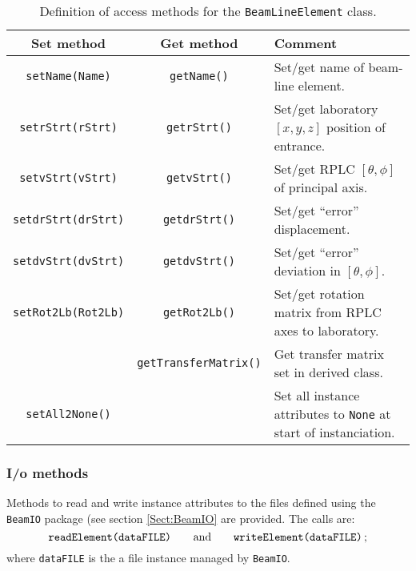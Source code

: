\begin{table}
  \caption{
    Definition of access methods for the \texttt{BeamLineElement}
    class. 
  }
  \label{Tab:BLE:Methods}
  \begin{center}
    \begin{tabular}{|c|c|p{7cm}|}
      \hline
      \textbf{Set method} & \textbf{Get method}  & \textbf{Comment}                                                         \\
      \hline
      \texttt{setName(Name)}     & \texttt{getName()}   & Set/get name of beam-line element.                                \\
      \texttt{setrStrt(rStrt)}   & \texttt{getrStrt()}  & Set/get laboratory $[x, y, z]$ position of entrance.              \\
      \texttt{setvStrt(vStrt)}   & \texttt{getvStrt()}  & Set/get RPLC $[\theta, \phi]$ of principal axis.                  \\
      \texttt{setdrStrt(drStrt)} & \texttt{getdrStrt()} & Set/get ``error'' displacement.                                   \\
      \texttt{setdvStrt(dvStrt)} & \texttt{getdvStrt()} & Set/get ``error'' deviation in $[\theta, \phi]$.                  \\
      \texttt{setRot2Lb(Rot2Lb)} & \texttt{getRot2Lb()} & Set/get rotation matrix from RPLC axes to laboratory.             \\
                         & \texttt{getTransferMatrix()} & Get transfer matrix set in derived class.                         \\
      \texttt{setAll2None()}     &                      & Set all instance attributes to \texttt{None} at start of instanciation. \\
      \hline
    \end{tabular}
  \end{center}
\end{table}

\subsubsection{I/o methods}
Methods to read and write instance attributes to the files defined
using the \texttt{BeamIO} package (see section \ref{Sect:BeamIO} are
provided.
The calls are:
\begin{equation}
  \texttt{readElement(dataFILE)} \quad \quad {\rm and } \quad \quad \texttt{writeElement(dataFILE)} \,; \nonumber
\end{equation}
where \texttt{dataFILE} is the a file instance managed by \texttt{BeamIO}.
